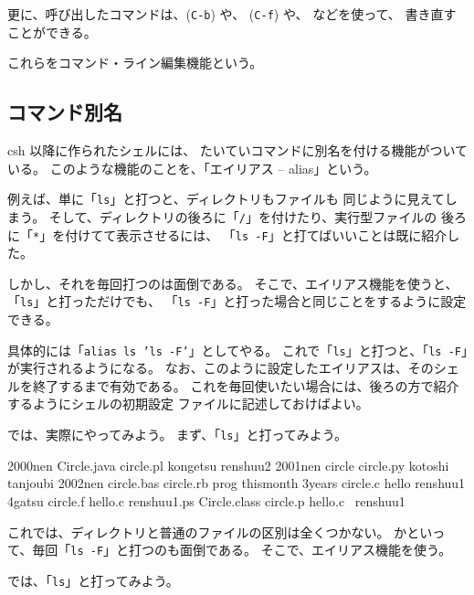 更に、呼び出したコマンドは、(\texttt{C-b}) や、
(\texttt{C-f}) や、  などを使って、
書き直すことができる。

これらをコマンド・ライン編集機能という。

\subsection{コマンド別名}

csh 以降に作られたシェルには、
たいていコマンドに別名を付ける機能がついている。
このような機能のことを、「エイリアス -- alias」という。

例えば、単に「\texttt{ls}」と打つと、ディレクトリもファイルも
同じように見えてしまう。
そして、ディレクトリの後ろに「\verb+/+」を付けたり、実行型ファイルの
後ろに「\verb+*+」を付けてて表示させるには、
「\texttt{ls -F}」と打てばいいことは既に紹介した。

しかし、それを毎回打つのは面倒である。
そこで、エイリアス機能を使うと、「\texttt{ls}」と打っただけでも、
「\texttt{ls -F}」と打った場合と同じことをするように設定できる。

具体的には「\texttt{alias ls 'ls -F'}」としてやる。
これで「\texttt{ls}」と打つと、「\texttt{ls -F}」が実行されるようになる。
なお、このように設定したエイリアスは、そのシェルを終了するまで有効である。
これを毎回使いたい場合には、後ろの方で紹介するようにシェルの初期設定
ファイルに記述しておけばよい。

では、実際にやってみよう。
まず、「\texttt{ls}」と打ってみよう。

\begin{progls}
2000nen         Circle.java     circle.pl       kongetsu        renshuu2
2001nen         circle          circle.py       kotoshi         tanjoubi
2002nen         circle.bas      circle.rb       prog            thismonth
3years          circle.c        hello           renshuu1
4gatsu          circle.f        hello.c         renshuu1.ps
Circle.class    circle.p        hello.c~        renshuu1~
%
\end{progls}

これでは、ディレクトリと普通のファイルの区別は全くつかない。
かといって、毎回「\texttt{ls -F}」と打つのも面倒である。
そこで、エイリアス機能を使う。

\begin{progls}
%
\end{progls}

\newpage

では、「\texttt{ls}」と打ってみよう。

